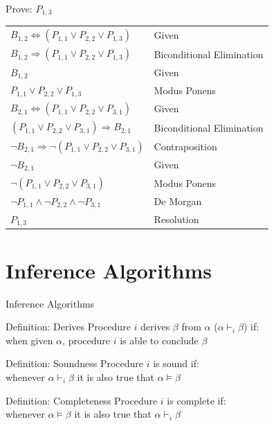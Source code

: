 \documentclass[14pt]{beamer}
\newcommand{\limpl}{\Rightarrow}
\newcommand{\liff}{\Leftrightarrow}
\begin{document}
\begin{frame}{Prove: $P_{1, 3}$}
	\begin{tabular}{ll}
		$B_{1, 2} \liff (P_{1, 1} \lor P_{2, 2} \lor P_{1, 3})$             & Given \pause\\
		$B_{1, 2} \limpl (P_{1, 1} \lor P_{2, 2} \lor P_{1, 3})$            & Biconditional Elimination \pause\\
		$B_{1, 2}$                                                          & Given \pause\\
		$P_{1, 1} \lor P_{2, 2} \lor P_{1, 3}$                              & Modus Ponens \pause\\[1em]
		
		$B_{2, 1} \liff (P_{1, 1} \lor P_{2, 2} \lor P_{3, 1})$             & Given \pause\\
		$(P_{1, 1} \lor P_{2, 2} \lor P_{3, 1}) \limpl B_{2, 1}$            & Biconditional Elimination \pause\\
		$\lnot B_{2, 1} \limpl \lnot(P_{1, 1} \lor P_{2, 2} \lor P_{3, 1})$ & Contraposition \pause\\
		$\lnot B_{2, 1}$                                                    & Given \pause\\
		$\lnot(P_{1, 1} \lor P_{2, 2} \lor P_{3, 1})$                       & Modus Ponens \pause\\
		$\lnot P_{1, 1} \land \lnot P_{2, 2} \land \lnot P_{3, 1}$          & De Morgan \pause\\[1em]

		$P_{1, 3}$                                                          & Resolution \\
	\end{tabular}
\end{frame}


\section{Inference Algorithms}
\begin{frame}{Inference Algorithms}
	\begin{block}{Definition: Derives}
		Procedure $i$ \alert{derives} $\beta$ from $\alpha$ ($\alpha \vdash_i \beta$) if:\\
		\hspace{1em} when given $\alpha$, procedure $i$ is able to conclude $\beta$
	\end{block}
	\pause
	\begin{block}{Definition: Soundness}
		Procedure $i$ is \alert{sound} if:\\
		\hspace{1em} whenever $\alpha \vdash_i \beta$ it is also true that $\alpha \models \beta$
	\end{block}
	\pause
	\begin{block}{Definition: Completeness}
		Procedure $i$ is \alert{complete} if:\\
		\hspace{1em} whenever $\alpha \models \beta$ it is also true that $\alpha \vdash_i \beta$
	\end{block}
\end{frame}
\end{document}
